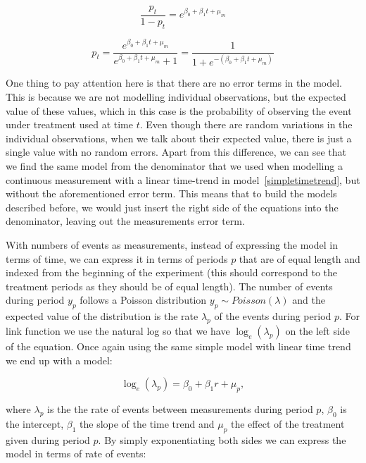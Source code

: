 \documentclass[12pt,a4paper,leqno]{report}
\theoremstyle{plain}
\theoremstyle{definition}
\theoremstyle{remark}
\begin{document}
\begin{def}\label{}
    \begin{equation}\label{}
        \frac{p_t}{1-p_t}=e^{\beta_0 + \beta_1 t + \mu_m}
    \end{equation}
\end{def}

\begin{def}\label{}
    \begin{equation}\label{}
        p_t=\frac{e^{\beta_0 + \beta_1 t + \mu_m}}{e^{\beta_0 + \beta_1 t + \mu_m}+1}=\frac{1}{1+e^{-(\beta_0 + \beta_1 t + \mu_m)}}
    \end{equation}
\end{def}

One thing to pay attention here is that there are no error terms in the model. This is because we are
not modelling individual observations, but the expected value of these values, which in
this case is the probability of observing the event under treatment used at time \(t\).
Even though there are random variations in the individual observations,
when we talk about their expected value, there is just a single value with no
random errors. Apart from this difference, we can see that we find the same model
from the denominator that we used when modelling a continuous measurement with a
linear time-trend in model\ \ref{simpletimetrend}, but without the
aforementioned error term. This means that to build the models described before,
we would just insert the right side of the equations into the denominator,
leaving out the measurements error term.

With numbers of events as measurements, instead of expressing the model in terms
of time, we can express it in terms of periods \(p\) that are of equal length
and indexed from the beginning of the experiment (this should correspond to the
treatment periods as they should be of equal length). The number of events during
period \(y_p\) follows a Poisson distribution \(y_p \sim Poisson(\lambda)\) and
the expected value of the distribution is the rate \(\lambda_p \) of the events
during period \(p\). For link function we use the natural log so that we have
\(\log_e(\lambda_p)\) on the left side of the equation. Once again using the
same simple model with linear time trend we end up with a model:

\begin{def}\label{oneerror}
    \begin{equation}
        \log_e(\lambda_p)=\beta_0 + \beta_1 r + \mu_{p},
    \end{equation}
\end{def}where \(\lambda_p\) is the the rate of events between measurements
during period \(p\), \(\beta_0\) is the intercept, \(\beta_1\) the slope of the
time trend and \(\mu_p\) the effect of the treatment given during period \(p\).
By simply exponentiating both sides we can express the model in terms of rate of
events:
\end{document}
